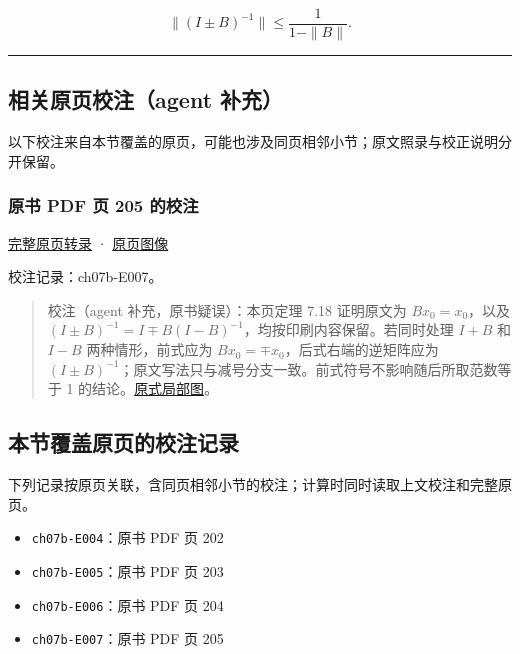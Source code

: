 \documentclass[
  10pt,
  fontset=fandol]{ctexart}
\providecommand{\tightlist}{%
  \setlength{\itemsep}{0pt}\setlength{\parskip}{0pt}}
\begin{document}
\[
\|(I\pm B)^{-1}\|\leqslant\frac1{1-\|B\|}.
\]

\begin{center}\rule{0.5\linewidth}{0.5pt}\end{center}

\subsection{相关原页校注（agent 补充）}\label{ux76f8ux5173ux539fux9875ux6821ux6ce8agent-ux8865ux5145}

以下校注来自本节覆盖的原页，可能也涉及同页相邻小节；原文照录与校正说明分开保留。

\subsubsection{原书 PDF 页 205 的校注}\label{ux539fux4e66-pdf-ux9875-205-ux7684ux6821ux6ce8}

\href{../pages/pdf-205.md}{完整原页转录} · \href{../../source-images/pdf-205.jpeg}{原页图像}

校注记录：ch07b-E007。

\begin{quote}
校注（agent 补充，原书疑误）：本页定理 7.18 证明原文为 \(Bx_0=x_0\)，以及 \((I\pm B)^{-1}=I\mp B(I-B)^{-1}\)，均按印刷内容保留。若同时处理 \(I+B\) 和 \(I-B\) 两种情形，前式应为 \(Bx_0=\mp x_0\)，后式右端的逆矩阵应为 \((I\pm B)^{-1}\)；原文写法只与减号分支一致。前式符号不影响随后所取范数等于 1 的结论。\href{../assets/ch07b/205-inverse-signs.png}{原式局部图}。
\end{quote}

\subsection{本节覆盖原页的校注记录}\label{ux672cux8282ux8986ux76d6ux539fux9875ux7684ux6821ux6ce8ux8bb0ux5f55}

下列记录按原页关联，含同页相邻小节的校注；计算时同时读取上文校注和完整原页。

\begin{itemize}
\tightlist
\item
  \texttt{ch07b-E004}：原书 PDF 页 202
\item
  \texttt{ch07b-E005}：原书 PDF 页 203
\item
  \texttt{ch07b-E006}：原书 PDF 页 204
\item
  \texttt{ch07b-E007}：原书 PDF 页 205
\end{itemize}
\end{document}
